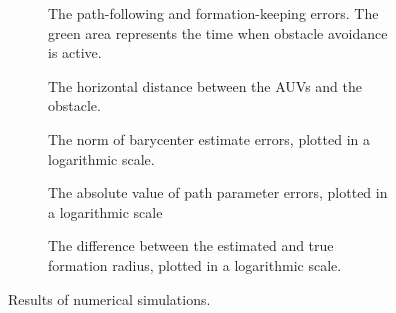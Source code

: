 \begin{figure}[t]
    \begin{minipage}{0.48\textwidth}
        \begin{subfigure}{\textwidth}
            
            \vspace{-7mm}
            \caption{The path-following and formation-keeping errors. The green area represents the time when obstacle avoidance is active.}
            \label{fig:distr_NSB_sim_errors}
        \end{subfigure}

        \begin{subfigure}{\textwidth}
            
            \vspace{-7mm}
            \caption{The horizontal distance between the AUVs and the obstacle.}
            \label{fig:distr_NSB_sim_distance}
        \end{subfigure}
        \vspace{-7mm}
    \end{minipage}
    \hspace{\fill}
    \begin{minipage}{0.48\textwidth}
        \begin{subfigure}{\textwidth}
            
            \vspace{-7mm}
            \caption{The norm of barycenter estimate errors, plotted in a logarithmic scale.}
            \label{fig:distr_NSB_sim_barycenter}
        \end{subfigure}
    
        \begin{subfigure}{\textwidth}
            
            \vspace{-7mm}
            \caption{The absolute value of path parameter errors, plotted in a logarithmic scale}
            \label{fig:distr_NSB_sim_parameter}
        \end{subfigure}

        \begin{subfigure}{\textwidth}
            
            \vspace{-7mm}
            \caption{The difference between the estimated and true formation radius, plotted in a logarithmic scale.}
            \label{fig:distr_NSB_sim_radius}
        \end{subfigure}
        \vspace{-7mm}
    \end{minipage}

    \caption{Results of numerical simulations.}
    \label{fig:distr_NSB_simulation}
\end{figure}

